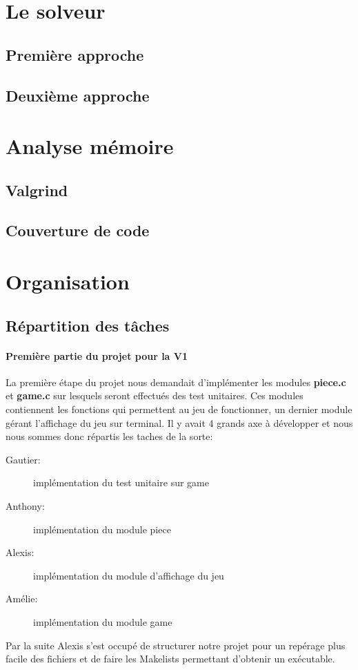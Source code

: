 \documentclass{report}
\begin{document}
\part{Le solveur}
\setcounter{chapter}{0}
\chapter{Première approche}
\chapter{Deuxième approche}



\part{Analyse mémoire}
\setcounter{chapter}{0}
\chapter{Valgrind}

\chapter{Couverture de code}



\part{Organisation}
\setcounter{chapter}{0}
\chapter{Répartition des tâches}
\subsection*{Première partie du projet pour la V1}
La première étape du projet nous demandait d'implémenter les modules \textbf{piece.c} et \textbf{game.c} sur lesquels seront effectués des test unitaires. Ces modules contiennent les fonctions qui permettent au jeu de fonctionner, un dernier module gérant l'affichage du jeu sur terminal. Il y avait 4 grands axe à développer et nous nous sommes donc répartis les taches de la sorte:
\begin{description}
\item [Gautier:] implémentation du test unitaire sur game
\item [Anthony:] implémentation du module piece
\item [Alexis:] implémentation du module d'affichage du jeu
\item [Amélie:] implémentation du module game
\end{description}
Par la suite Alexis s'est occupé de structurer notre projet pour un repérage plus facile des fichiers et de faire les Makelists permettant d'obtenir un exécutable.
\end{document}
